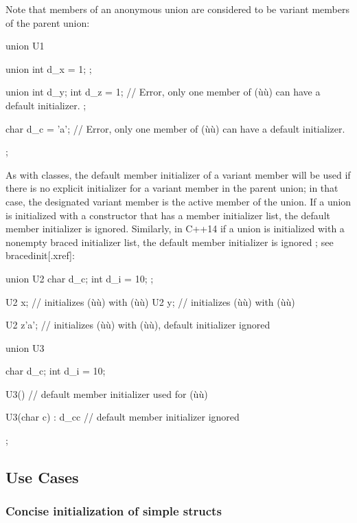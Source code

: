 Note that members of an anonymous union are considered to be variant
members of the parent union:

\begin{emcppslisting}
union U1
{
    union { int d_x = 1; };

    union
    {
        int d_y;
        int d_z = 1;
            // Error, only one member of (ù{}ù) can have a default initializer.
    };

    char d_c = 'a';
        // Error, only one member of (ù{}ù) can have a default initializer.
};
\end{emcppslisting}
    

As with classes, the default member initializer of a variant member will
be used if there is no explicit initializer for a variant member in the
parent union; in that case, the designated variant member is the active
member of the union. If a union is initialized with a constructor that
has a member initializer list, the default member initializer is
ignored. Similarly, in C++14 if a union is initialized with a nonempty braced
initializer list, the default member initializer is ignored ; see {bracedinit}[.xref]:

\begin{emcppslisting}[emcppsstandards={c++14}]
union U2
{
    char d_c;
    int  d_i = 10;
};

U2 x;       // initializes (ù{}ù) with (ù{}ù)
U2 y{};     // initializes (ù{}ù) with (ù{}ù)

U2 z{'a'};  // initializes (ù{}ù) with (ù{}ù), default initializer ignored

union U3
{
   char d_c;
   int  d_i = 10;

   U3() { }                 // default member initializer used for (ù{}ù)

   U3(char c) : d_c{c} { }  // default member initializer ignored
};
\end{emcppslisting}
    

\subsection[Use Cases]{Use Cases}\label{use-cases}

\subsubsection[Concise initialization of simple \lstinline!struct!s]{Concise initialization of simple {\SubsubsecCode struct}s}\label{concise-initialization-of-simple-structs}

